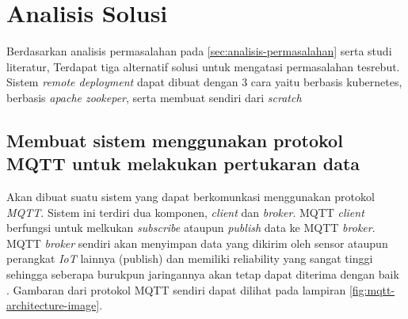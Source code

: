 \section{Analisis Solusi}

Berdasarkan analisis permasalahan pada \ref{sec:analisis-permasalahan} serta studi literatur, Terdapat tiga alternatif solusi untuk mengatasi permasalahan tesrebut. Sistem \textit{remote deployment} dapat dibuat dengan 3 cara yaitu berbasis kubernetes, berbasis \textit{apache zookeper}, serta membuat sendiri dari \textit{scratch}




\subsection{Membuat sistem menggunakan protokol MQTT untuk melakukan pertukaran data}
Akan dibuat suatu sistem yang dapat berkomunkasi menggunakan protokol \textit{MQTT}. Sistem ini terdiri dua komponen, \textit{client} dan \textit{broker}. MQTT \textit{client} berfungsi untuk melkukan \textit{subscribe} ataupun \textit{publish} data ke MQTT \textit{broker}. MQTT \textit{broker} sendiri akan menyimpan data yang dikirim oleh sensor ataupun perangkat \textit{IoT} lainnya (publish) dan memiliki reliability yang sangat tinggi sehingga seberapa burukpun jaringannya akan tetap dapat diterima dengan baik \parencite{mqtt}. Gambaran dari protokol MQTT sendiri dapat dilihat pada lampiran \ref{fig:mqtt-architecture-image}.

